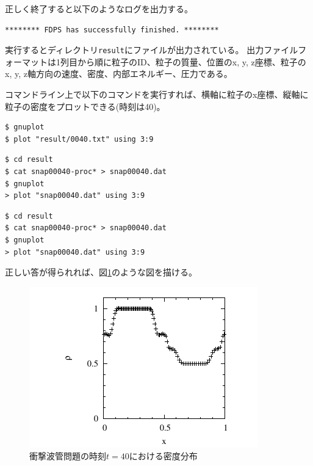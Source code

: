正しく終了すると以下のようなログを出力する。
\begin{screen}
\begin{verbatim}
******** FDPS has successfully finished. ********
\end{verbatim}
\end{screen}

実行するとディレクトリ\texttt{result}にファイルが出力されている。
出力ファイルフォーマットは1列目から順に粒子のID、粒子の質量、位置のx, y, z座標、粒子のx, y, z軸方向の速度、密度、内部エネルギー、圧力である。

コマンドライン上で以下のコマンドを実行すれば、横軸に粒子のx座標、縦軸に粒子の密度をプロットできる(時刻は40)。
\ifCpp %
\begin{screen}
\begin{verbatim}
$ gnuplot
$ plot "result/0040.txt" using 3:9
\end{verbatim}
\end{screen}
\endifCpp
\ifFtn %
\begin{screen}
\begin{verbatim}
$ cd result
$ cat snap00040-proc* > snap00040.dat
$ gnuplot
> plot "snap00040.dat" using 3:9
\end{verbatim}
\end{screen}
\endifFtn
\ifC %
\begin{screen}
\begin{verbatim}
$ cd result
$ cat snap00040-proc* > snap00040.dat
$ gnuplot
> plot "snap00040.dat" using 3:9
\end{verbatim}
\end{screen}
\endifC
正しい答が得られれば、図\ref{fig:sph}のような図を描ける。

\begin{figure}[h]
\centering
\includegraphics[width=0.5\linewidth]{fig/sph.pdf}
\caption{衝撃波管問題の時刻$t=40$における密度分布}
\label{fig:sph}
\end{figure}
